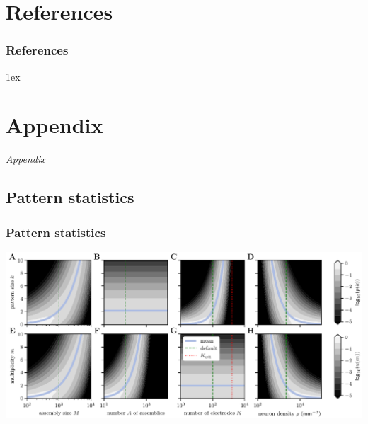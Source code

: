 \documentclass[8pt,t,usepdftitle=false]{beamer}
\begin{document}
\section{References}
\begin{frame}  
  \frametitle{References}
  \bibitemsep1ex
  \renewcommand{\bibfont}{\normalfont\small}
  \printbibliography
\end{frame}
\section{Appendix}
\begin{frame}[t,plain]
  \begin{center}
    \vspace*{\fill}
    \LARGE \emph{Appendix}
    \vspace*{\fill}
  \end{center}
\end{frame}
\def\ttl{Pattern statistics}
\subsection{\ttl}
\begin{frame}[plain]
  \frametitle{\ttl}
  \parbox{\linewidth}{
    \includegraphics[width=\linewidth]{./figures/minimal_model_stats_3d.pdf}\\
    {\footnotesize}
  }
\end{frame}
\def\ttl{Assembly detectability}
\end{document}
